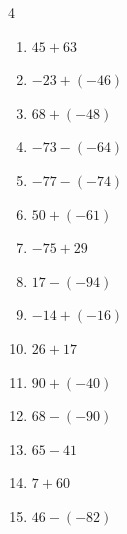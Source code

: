 \begin{multicols}{4}
\begin{enumerate}
        \phantom{$=57$}

  \item $45+63$

        \phantom{$=108$}

  \item $-23+(-46)$

        \phantom{$=-69$}

  \item $68+(-48)$

        \phantom{$=20$}

  \item $-73-(-64)$

        \phantom{$=-9$}

  \item $-77-(-74)$

        \phantom{$=-3$}

  \item $50+(-61)$

        \phantom{$=-11$}

  \item $-75+29$

        \phantom{$=-46$}

  \item $17-(-94)$

        \phantom{$=111$}

  \item $-14+(-16)$

        \phantom{$=-30$}

  \item $26+17$

        \phantom{$=43$}

  \item $90+(-40)$

        \phantom{$=50$}

  \item $68-(-90)$

        \phantom{$=158$}

  \item $65-41$

        \phantom{$=24$}

  \item $7+60$

        \phantom{$=67$}

  \item $46-(-82)$

        \phantom{$=128$}

\columnbreak %

\resetques


\end{enumerate}
\end{multicols}
